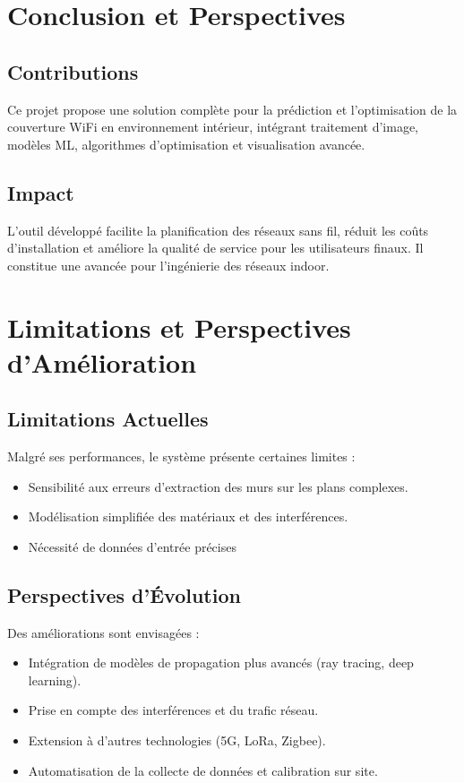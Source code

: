 \documentclass[12pt,a4paper]{article}
\begin{document}
\section{Conclusion et Perspectives}

\subsection{Contributions}
Ce projet propose une solution complète pour la prédiction et l’optimisation de la couverture WiFi en environnement intérieur, intégrant traitement d’image, modèles ML, algorithmes d’optimisation et visualisation avancée.

\subsection{Impact}
L’outil développé facilite la planification des réseaux sans fil, réduit les coûts d’installation et améliore la qualité de service pour les utilisateurs finaux. Il constitue une avancée pour l’ingénierie des réseaux indoor.

\section{Limitations et Perspectives d’Amélioration}

\subsection{Limitations Actuelles}
Malgré ses performances, le système présente certaines limites :
\begin{itemize}
    \item Sensibilité aux erreurs d’extraction des murs sur les plans complexes.
    \item Modélisation simplifiée des matériaux et des interférences.
    \item Nécessité de données d’entrée précises
\end{itemize}

\subsection{Perspectives d’Évolution}
Des améliorations sont envisagées :
\begin{itemize}
    \item Intégration de modèles de propagation plus avancés (ray tracing, deep learning).
    \item Prise en compte des interférences et du trafic réseau.
    \item Extension à d’autres technologies (5G, LoRa, Zigbee).
    \item Automatisation de la collecte de données et calibration sur site.
\end{itemize}
\end{document}
